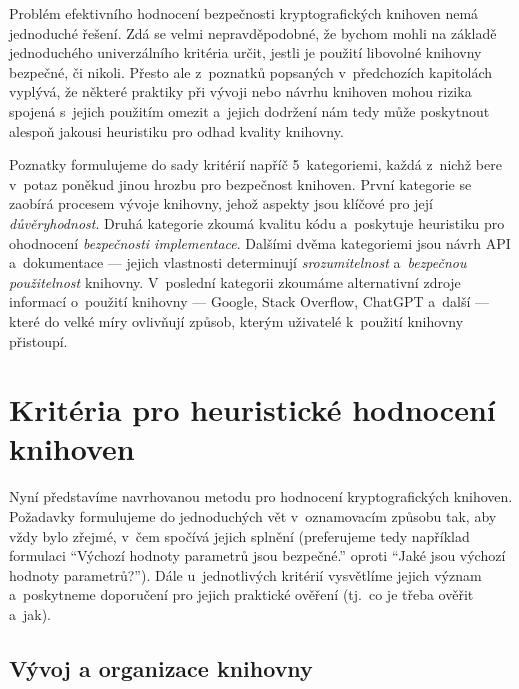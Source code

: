 \label{vysledky}

Problém efektivního hodnocení bezpečnosti kryptografických knihoven nemá jednoduché řešení. Zdá se velmi nepravděpodobné, že bychom mohli na základě jednoduchého univerzálního kritéria určit, jestli je použití libovolné knihovny bezpečné, či nikoli. Přesto ale z~poznatků popsaných v~předchozích kapitolách vyplývá, že některé praktiky při vývoji nebo návrhu knihoven mohou rizika spojená s~jejich použitím omezit a~jejich dodržení nám tedy může poskytnout alespoň jakousi heuristiku pro odhad kvality knihovny.

Poznatky formulujeme do sady kritérií napříč 5~kategoriemi, každá z~nichž bere v~potaz poněkud jinou hrozbu pro bezpečnost knihoven. První kategorie se zaobírá procesem vývoje knihovny, jehož aspekty jsou klíčové pro její \textit{důvěryhodnost}. Druhá kategorie zkoumá kvalitu kódu a~poskytuje heuristiku pro ohodnocení \textit{bezpečnosti implementace}. Dalšími dvěma kategoriemi jsou návrh API a~dokumentace --- jejich vlastnosti determinují \textit{srozumitelnost} a~\textit{bezpečnou použitelnost} knihovny. V~poslední kategorii zkoumáme alternativní zdroje informací o~použití knihovny --- Google, Stack Overflow, ChatGPT a~další --- které do velké míry ovlivňují způsob, kterým uživatelé k~použití knihovny přistoupí.

\section{Kritéria pro heuristické hodnocení knihoven}

Nyní představíme navrhovanou metodu pro hodnocení kryptografických knihoven. Požadavky formulujeme do jednoduchých vět v~oznamovacím způsobu tak, aby vždy bylo zřejmé, v~čem spočívá jejich splnění (preferujeme tedy například formulaci ``Výchozí hodnoty parametrů jsou bezpečné.'' oproti ``Jaké jsou výchozí hodnoty parametrů?''). Dále u~jednotlivých kritérií vy\-svět\-lí\-me jejich význam a~poskytneme doporučení pro jejich praktické ověření (tj.~co je třeba ověřit a~jak).

\subsection{Vývoj a organizace knihovny}

